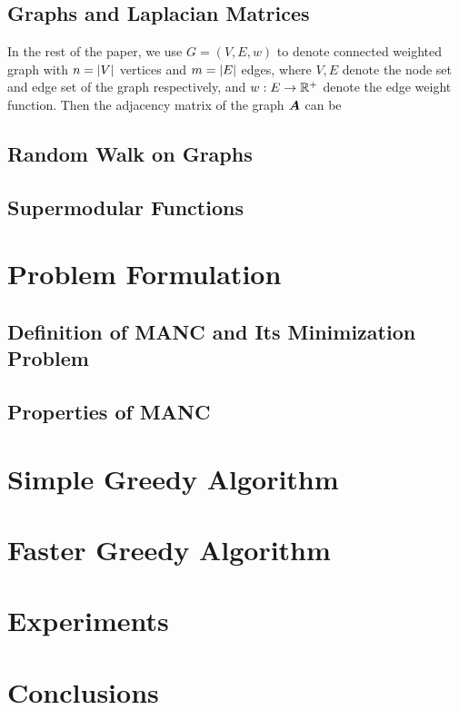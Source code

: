 \documentclass[sigconf]{acmart}
\begin{document}
\subsection{Graphs and Laplacian Matrices}

In the rest of the paper, we use \(G=(V,E,w)\) to denote connected weighted graph with \(n=\left|V \right|\) vertices and \(m=\left|E \right|\) edges, where \(V,E\) denote the node set and edge set of the graph respectively, and \(w:E\to\mathbb{R}^+\) denote the edge weight function. Then the adjacency matrix of the graph \(\boldsymbol{A}\) can be

\subsection{Random Walk on Graphs}

\subsection{Supermodular Functions}

\section{Problem Formulation}

\subsection{Definition of MANC and Its Minimization Problem}

\subsection{Properties of MANC}

\section{Simple Greedy Algorithm}

\section{Faster Greedy Algorithm}

\section{Experiments}

\section{Conclusions}


\balance
\nocite{*}

\end{document}
